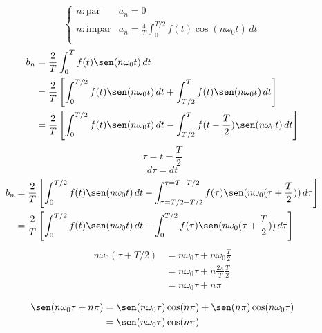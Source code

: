 \begin{equation}
\begin{cases}
    n: \text{par}   &a_n=0\\
    n: \text{impar} &a_n=\frac{4}{T}\int_0^{T/2}f(t)\cos(n\omega_0 t)\,dt\\
\end{cases}
\end{equation}
\begin{equation*}
\begin{split}
    b_n
        &=\frac{2}{T}\int_0^T f(t)\sen(n\omega_0 t)\,dt\\
        &=\frac{2}{T}\left[
            \int_0^{T/2} f(t)\sen(n\omega_0 t)\,dt+
            \int_{T/2}^T f(t)\sen(n\omega_0 t)\,dt
        \right]\\
        &=\frac{2}{T}\left[
            \int_0^{T/2} f(t)\sen(n\omega_0 t)\,dt-
            \int_{T/2}^T f(t-\frac{T}{2})\sen(n\omega_0 t)\,dt
        \right]\\
\end{split}
\end{equation*}
\begin{equation*}
    \tau=t-\frac{T}{2}
\end{equation*}
\begin{equation*}
    d\tau=dt
\end{equation*}
\begin{equation*}
\begin{split}
    b_n
        &=\frac{2}{T}\left[
            \int_0^{T/2} f(t)\sen(n\omega_0 t)\,dt-
            \int_{\tau=T/2-T/2}^{\tau=T-T/2}
                f(\tau)\sen(n\omega_0(\tau+\frac{T}{2}))\,d\tau
        \right]\\
        &=\frac{2}{T}\left[
            \int_0^{T/2} f(t)\sen(n\omega_0 t)\,dt-
            \int_0^{T/2} f(\tau)\sen(n\omega_0(\tau+\frac{T}{2}))\,d\tau
        \right]\\
\end{split}
\end{equation*}
\begin{equation*}
\begin{split}
    n\omega_0(\tau+T/2)
        &=n\omega_0\tau+n\omega_0\frac{T}{2}\\
        &=n\omega_0\tau+n\frac{2\pi}{T}\frac{T}{2}\\
        &=n\omega_0\tau+n\pi\\
\end{split}
\end{equation*}
\begin{equation*}
\begin{split}
    \sen(n\omega_0\tau+n\pi)
        &=\sen(n\omega_0\tau)\cos(n\pi)+\sen(n\pi)\cos(n\omega_0\tau)\\
        &=\sen(n\omega_0\tau)\cos(n\pi)\\
\end{split}
\end{equation*}
